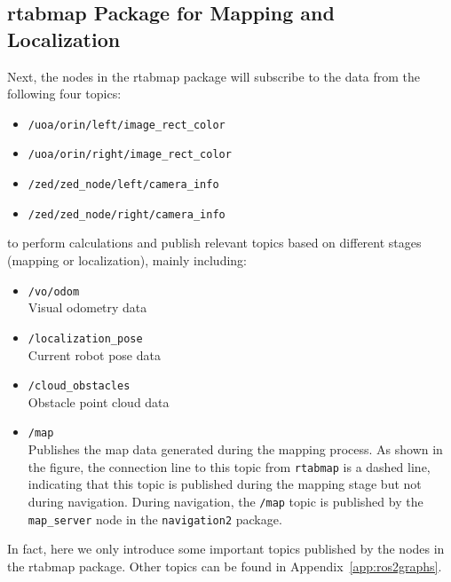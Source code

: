 \subsection{rtabmap Package for Mapping and Localization}
Next, the nodes in the rtabmap package will subscribe to the data from the following four topics:
\begin{itemize}
    \item \texttt{/uoa/orin/left/image\_rect\_color}
    \item \texttt{/uoa/orin/right/image\_rect\_color}
    \item \texttt{/zed/zed\_node/left/camera\_info}
    \item \texttt{/zed/zed\_node/right/camera\_info}
\end{itemize}
to perform calculations and publish relevant topics based on different stages (mapping or localization), mainly including:
\begin{itemize}
    \item \texttt{/vo/odom} \\
        Visual odometry data
    \item \texttt{/localization\_pose} \\
        Current robot pose data
    \item \texttt{/cloud\_obstacles} \\
        Obstacle point cloud data
    \item \texttt{/map} \\
        Publishes the map data generated during the mapping process. As shown in the figure, the connection line to this topic from \texttt{rtabmap} is a dashed line, indicating that this topic is published during the mapping stage but not during navigation. During navigation, the \texttt{/map} topic is published by the \texttt{map\_server} node in the \texttt{navigation2} package.
\end{itemize}
In fact, here we only introduce some important topics published by the nodes in the rtabmap package. Other topics can be found in Appendix~\ref{app:ros2graphs}.

